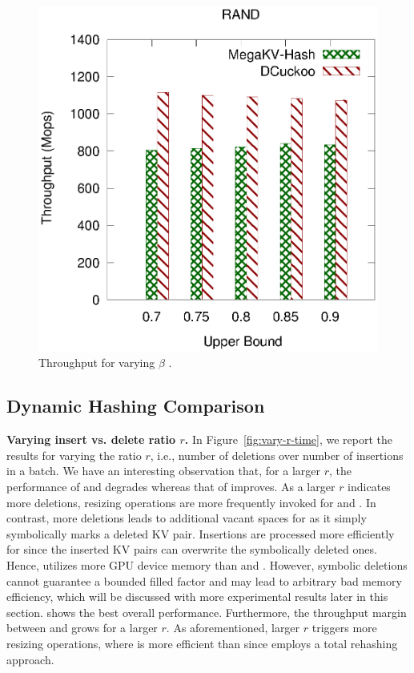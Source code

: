 \begin{figure}[htp]
\begin{minipage}{0.19\linewidth}
		\centerline{\dsali}
	\end{minipage}
	\begin{minipage}{0.19\linewidth}\centering
		\includegraphics[width=\linewidth]{pic/dynamic/upper/dynamic_random.eps}
		\centerline{\dsrandom}
	\end{minipage}
	\caption{Throughput for varying $\beta$ .}
	\label{fig:vary-upper-time}
\end{figure}

\subsection{Dynamic Hashing Comparison}\label{sec:exp:dynamic}

\noindent\textbf{Varying insert vs. delete ratio $r$.}
In Figure~\ref{fig:vary-r-time}, we report the results for varying the ratio $r$, i.e., number of deletions over number of insertions in a batch.
We have an interesting observation that, for a larger $r$, the performance of \voter and \megakv degrades whereas that of \slab improves. As a larger $r$ indicates more deletions, resizing operations are more frequently invoked for \voter and \megakv. In contrast, more deletions leads to additional vacant spaces for \slab as it simply symbolically marks a deleted KV pair. Insertions are processed more efficiently for \slab since the inserted KV pairs can overwrite the symbolically deleted ones. Hence, \slab utilizes more GPU device memory than \voter and \megakv. However, symbolic deletions cannot guarantee a bounded filled factor and may lead to arbitrary bad memory efficiency, which will be discussed with more experimental results later in this section.
\voter shows the best overall performance. Furthermore, the throughput margin between \voter and \megakv grows for a larger $r$. 
As aforementioned, larger $r$ triggers more resizing operations, where \voter is more efficient than \megakv since \megakv employs a total rehashing approach. 

